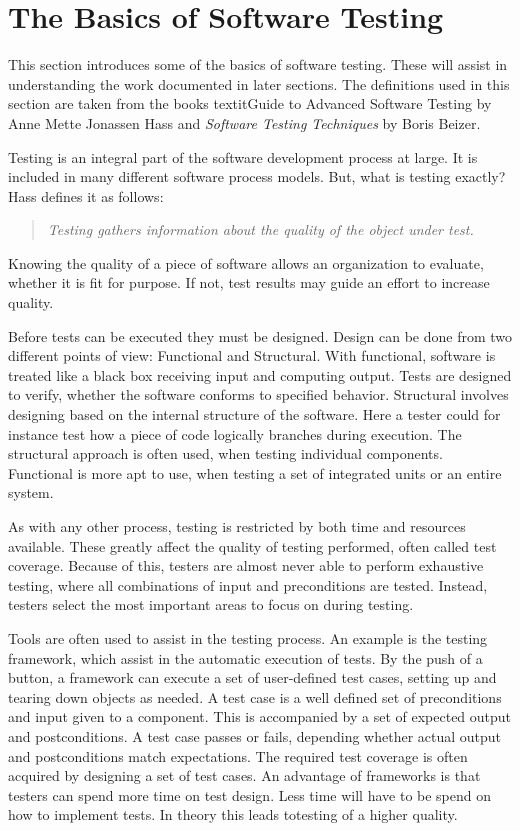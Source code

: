 \section{The Basics of Software Testing}\label{sect:btesting}
This section introduces some of the basics of software testing. These will assist in understanding the work documented in later sections. The definitions used in this section are taken from the books textit{Guide to Advanced Software Testing} by Anne Mette Jonassen Hass\cite{Hass} and \textit{Software Testing Techniques} by Boris Beizer\cite{Beizer}.

Testing is an integral part of the software development process at large. It is included in many different software process models. But, what is testing exactly? Hass defines it as follows: 
 \begin{quotation} \textit{Testing gathers information about the quality of the object under test.}\end{quotation}  
Knowing the quality of a piece of software allows an organization to evaluate, whether it is fit for purpose. If not, test results may guide an effort to increase quality.

Before tests can be executed they must be designed.  Design can be done from two different points of view: Functional and Structural. With functional, software is treated like a black box receiving input and computing output. Tests are designed to verify, whether the software conforms to specified behavior. Structural involves designing based on the internal structure of the software. Here a tester could for instance test how a piece of code logically branches during execution. The structural approach is often used, when testing individual components. Functional is more apt to use, when testing a set of integrated units or an entire system. 

As with any other process, testing is restricted by both time and resources available. These greatly affect the quality of testing performed, often called test coverage. Because of this, testers are almost never able to perform exhaustive testing, where all combinations of input and preconditions are tested. Instead, testers select the most important areas to focus on during testing.  

Tools are often used to assist in the testing process. An example is the testing framework, which assist in the automatic execution of tests. By the push of a button, a framework can execute a set of user-defined test cases, setting up and tearing down objects as needed. A test case is a well defined set of preconditions and input given to a component. This is  accompanied by a set of expected output and postconditions. A test case passes or fails, depending whether actual output and postconditions match expectations.  The required test coverage is often acquired by designing a set of test cases. An advantage of frameworks is that testers can spend more time on test design. Less time will have to be spend on how to implement tests.  In theory this leads totesting of a higher quality.

